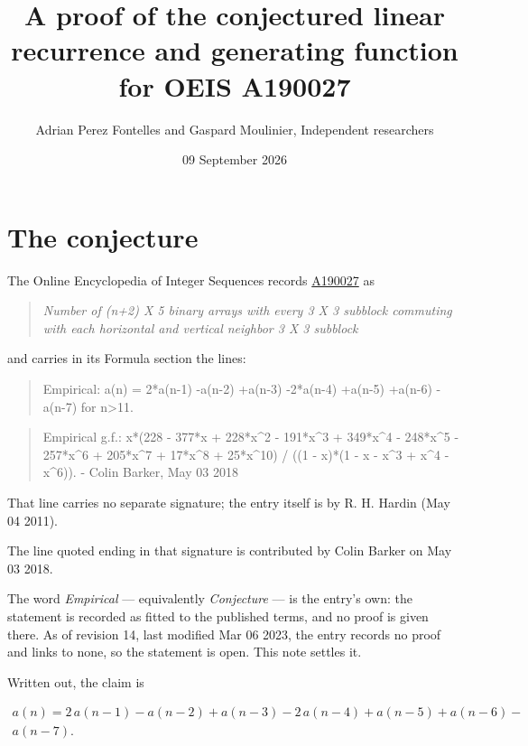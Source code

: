 \documentclass[11pt]{article}
\title{A proof of the conjectured linear recurrence and generating function for OEIS A190027}
\author{Adrian Perez Fontelles and Gaspard Moulinier, Independent researchers}
\date{09 September 2026}
\theoremstyle{definition}
\begin{document}
\maketitle
\section{The conjecture}

The Online Encyclopedia of Integer Sequences records \href{https://oeis.org/A190027}{A190027} as

\begin{quote}\itshape Number of (n+2) X 5 binary arrays with every 3 X 3 subblock commuting with each horizontal and vertical neighbor 3 X 3 subblock\end{quote}

and carries in its Formula section the lines:

\begin{quote}\ttfamily Empirical: a(n) = 2*a(n-1) -a(n-2) +a(n-3) -2*a(n-4) +a(n-5) +a(n-6) -a(n-7) for n>11.\end{quote}

\begin{quote}\ttfamily Empirical g.f.: x*(228 - 377*x + 228*x\textasciicircum{}2 - 191*x\textasciicircum{}3 + 349*x\textasciicircum{}4 - 248*x\textasciicircum{}5 - 257*x\textasciicircum{}6 + 205*x\textasciicircum{}7 + 17*x\textasciicircum{}8 + 25*x\textasciicircum{}10) / ((1 - x)*(1 - x - x\textasciicircum{}3 + x\textasciicircum{}4 - x\textasciicircum{}6)). - Colin Barker, May 03 2018\end{quote}

That line carries no separate signature; the entry itself is by R. H. Hardin (May 04 2011).

The line quoted ending in that signature is contributed by Colin Barker on May 03 2018.

The word {\itshape Empirical} --- equivalently {\itshape Conjecture} --- is the entry's own: the statement is recorded as fitted to the published terms, and no proof is given there. As of revision 14, last modified Mar 06 2023, the entry records no proof and links to none, so the statement is open. This note settles it.

Written out, the claim is

\begin{multline*} a(n) = 2\,a(n-1) - a(n-2) + a(n-3) - 2\,a(n-4) + a(n-5) + a(n-6) - \\ a(n-7). \end{multline*}
\end{document}

